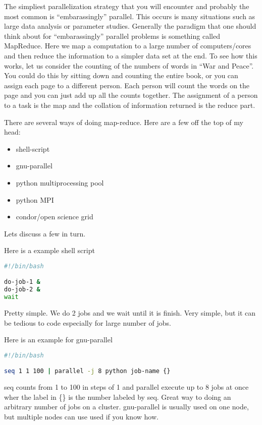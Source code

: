 The simpliest parallelization strategy that you will encounter and probably the most common is ``embarassingly'' parallel.  This occurs is many situations such as large data analysis or parameter studies.  Generally the paradigm that one should think about for ``embarassingly'' parallel problems is something called MapReduce.  Here we map a computation to a large number of computers/cores and then reduce the information to a simpler data set at the end.  To see how this works, let us consider the counting of the numbers of words in ``War and Peace''.  You could do this by sitting down and counting the entire book, or you can assign each page to a different person.  Each person will count the words on the page and you can just add up all the counts together.  The assignment of a person to a task is the map and the collation of information returned is the reduce part.  

There are several ways of doing map-reduce.  Here are a few off the top of my head:
\begin{itemize}
    \item shell-script
    \item gnu-parallel
    \item python multiprocessing pool
    \item python MPI
    \item condor/open science grid
\end{itemize}

Lets discuss a few in turn.  

Here is a example shell script
\begin{lstlisting}[language=bash]
#!/bin/bash

do-job-1 &
do-job-2 &
wait
\end{lstlisting}
Pretty simple.  We do 2 jobs and we wait until it is finish.  Very simple, but it can be tedious to code especially for large number of jobs.

Here is an example for gnu-parallel
\begin{lstlisting}[language=bash]
#!/bin/bash

seq 1 1 100 | parallel -j 8 python job-name {}

\end{lstlisting}
seq counts from 1 to 100 in steps of 1 and parallel execute up to 8 jobs at once wher the label in \{\} is the number labeled by seq.  Great way to doing an arbitrary number of jobs on a cluster.  gnu-parallel is usually used on one node, but multiple  nodes can use used if you know how. 

